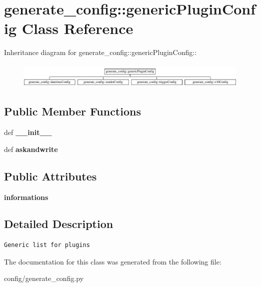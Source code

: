 \hypertarget{classgenerate__config_1_1genericPluginConfig}{
\section{generate\_\-config::genericPluginConfig Class Reference}
\label{classgenerate__config_1_1genericPluginConfig}
}
Inheritance diagram for generate\_\-config::genericPluginConfig::\begin{figure}[H]
\begin{center}
\leavevmode
\includegraphics[height=1.20172cm]{classgenerate__config_1_1genericPluginConfig}
\end{center}
\end{figure}
\subsection*{Public Member Functions}
\begin{CompactItemize}
\item 
\hypertarget{classgenerate__config_1_1genericPluginConfig_6e5142c1890303123b37a9b1015601c8}{
def \textbf{\_\-\_\-init\_\-\_\-}}
\label{classgenerate__config_1_1genericPluginConfig_6e5142c1890303123b37a9b1015601c8}

\item 
\hypertarget{classgenerate__config_1_1genericPluginConfig_5e6843b1a07f91051930ac9ae93f4494}{
def \textbf{askandwrite}}
\label{classgenerate__config_1_1genericPluginConfig_5e6843b1a07f91051930ac9ae93f4494}

\end{CompactItemize}
\subsection*{Public Attributes}
\begin{CompactItemize}
\item 
\hypertarget{classgenerate__config_1_1genericPluginConfig_4d6143782994ef3d177b90f38f4512c4}{
\textbf{informations}}
\label{classgenerate__config_1_1genericPluginConfig_4d6143782994ef3d177b90f38f4512c4}

\end{CompactItemize}


\subsection{Detailed Description}


\footnotesize\begin{verbatim}
Generic list for plugins
\end{verbatim}
\normalsize
 

The documentation for this class was generated from the following file:\begin{CompactItemize}
\item 
config/generate\_\-config.py\end{CompactItemize}
